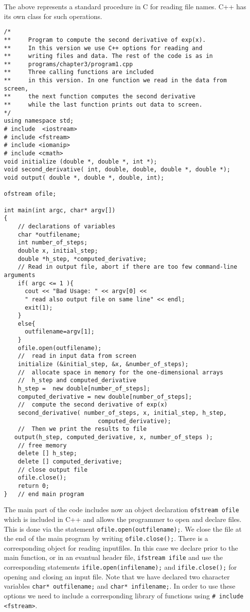 The above represents a standard  procedure in C for reading file
names. C++ has its own class for such operations. 
\begin{lstlisting}[title={\url{http://folk.uio.no/mhjensen/compphys/programs/chapter03/cpp/program3.cpp}}]
/*
**     Program to compute the second derivative of exp(x).
**     In this version we use C++ options for reading and
**     writing files and data. The rest of the code is as in
**     programs/chapter3/program1.cpp 
**     Three calling functions are included
**     in this version. In one function we read in the data from screen,
**     the next function computes the second derivative
**     while the last function prints out data to screen.
*/
using namespace std;
# include  <iostream> 
# include <fstream>
# include <iomanip>
# include <cmath>
void initialize (double *, double *, int *);
void second_derivative( int, double, double, double *, double *);
void output( double *, double *, double, int);

ofstream ofile;

int main(int argc, char* argv[])
{
    // declarations of variables 
    char *outfilename;
    int number_of_steps;
    double x, initial_step;
    double *h_step, *computed_derivative;
    // Read in output file, abort if there are too few command-line arguments
    if( argc <= 1 ){
      cout << "Bad Usage: " << argv[0] <<
      " read also output file on same line" << endl;
      exit(1);
    }
    else{
      outfilename=argv[1];
    }
    ofile.open(outfilename);
    //  read in input data from screen 
    initialize (&initial_step, &x, &number_of_steps);
    //  allocate space in memory for the one-dimensional arrays  
    //  h_step and computed_derivative                           
    h_step =  new double[number_of_steps];
    computed_derivative = new double[number_of_steps];
    //  compute the second derivative of exp(x) 
    second_derivative( number_of_steps, x, initial_step, h_step, 
                           computed_derivative);        
    //  Then we print the results to file  
   output(h_step, computed_derivative, x, number_of_steps );
    // free memory
    delete [] h_step;
    delete [] computed_derivative; 
    // close output file
    ofile.close();
    return 0;
}   // end main program 
\end{lstlisting}
The main part of the code includes now an object declaration \verb?ofstream ofile?
which is included in C++ and allows the programmer to open  and declare files.
This is done via the statement \verb?ofile.open(outfilename);?. We close the file
at the end of the main program by writing \verb?ofile.close();?.
There is a corresponding object for reading inputfiles. In this case we declare prior
to the main function, or in an evantual header file, \verb?ifstream ifile?
and use the corresponding statements \verb?ifile.open(infilename);?
and \verb?ifile.close();? for opening and closing an input file.
Note that we have declared two character variables \verb?char* outfilename;?
and \verb?char* infilename;?. In order to use these options we need to include a 
corresponding library of functions using \verb?# include <fstream>?.

